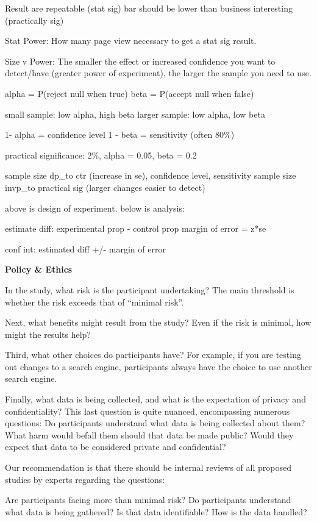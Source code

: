 \documentclass[]{book}
\begin{document}
Result are repeatable (stat sig) bar should be lower than business
interesting (practically sig)

Stat Power: How many page view necessary to get a stat sig result.

Size v Power: The smaller the effect or increased confidence you want to
detect/have (greater power of experiment), the larger the sample you
need to use.

alpha = P(reject null when true) beta = P(accept null when false)

small sample: low alpha, high beta larger sample: low alpha, low beta

1- alpha = confidence level 1 - beta = sensitivity (often 80\%)

practical significance: 2\%, alpha = 0.05, beta = 0.2

sample size dp\_to ctr (increase in se), confidence level, sensitivity
sample size invp\_to practical sig (larger changes easier to detect)

above is design of experiment. below is analysis:

estimate diff: experimental prop - control prop margin of error = z*se

conf int: estimated diff +/- margin of error

\textbf{Policy \& Ethics}

In the study, what risk is the participant undertaking? The main
threshold is whether the risk exceeds that of ``minimal risk''.

Next, what benefits might result from the study? Even if the risk is
minimal, how might the results help?

Third, what other choices do participants have? For example, if you are
testing out changes to a search engine, participants always have the
choice to use another search engine.

Finally, what data is being collected, and what is the expectation of
privacy and confidentiality? This last question is quite nuanced,
encompassing numerous questions: Do participants understand what data is
being collected about them? What harm would befall them should that data
be made public? Would they expect that data to be considered private and
confidential?

Our recommendation is that there should be internal reviews of all
proposed studies by experts regarding the questions:

Are participants facing more than minimal risk? Do participants
understand what data is being gathered? Is that data identifiable? How
is the data handled?
\end{document}
